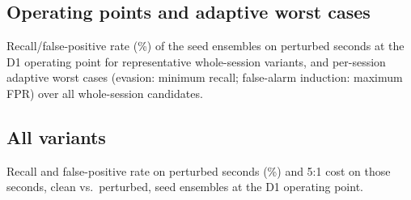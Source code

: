 \subsection{Operating points and adaptive worst cases}
Recall/false-positive rate (\%) of the seed ensembles on perturbed seconds at the D1 operating point for representative whole-session variants, and per-session adaptive worst cases (evasion: minimum recall; false-alarm induction: maximum FPR) over all \AttAucNVariants{} whole-session candidates.

{\footnotesize}

\subsection{All variants}
Recall and false-positive rate on perturbed seconds (\%) and 5:1 cost on those seconds, clean vs.\ perturbed, seed ensembles at the D1 operating point.

{\scriptsize\setlength{\tabcolsep}{2.5pt}}
